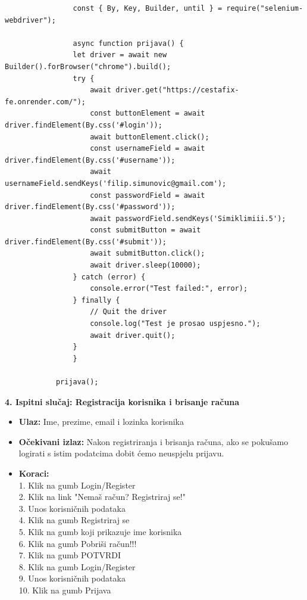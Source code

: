 			\begin{verbatim}
				const { By, Key, Builder, until } = require("selenium-webdriver");

				async function prijava() {
				let driver = await new Builder().forBrowser("chrome").build();
				try {
					await driver.get("https://cestafix-fe.onrender.com/");
					const buttonElement = await driver.findElement(By.css('#login'));
					await buttonElement.click();
					const usernameField = await driver.findElement(By.css('#username'));
					await usernameField.sendKeys('filip.simunovic@gmail.com');
					const passwordField = await driver.findElement(By.css('#password'));
					await passwordField.sendKeys('Simiklimiii.5');
					const submitButton = await driver.findElement(By.css('#submit'));
					await submitButton.click();
					await driver.sleep(10000);
				} catch (error) {
					console.error("Test failed:", error);
				} finally {
					// Quit the driver
					console.log("Test je prosao uspjesno.");
					await driver.quit();
				}
				}

			prijava();
			\end{verbatim}

			\textbf{4. Ispitni slučaj: Registracija korisnika i brisanje računa}
			 \begin{itemize}
				\item \textbf{Ulaz:} Ime, prezime, email i lozinka korisnika
				\item \textbf{Očekivani izlaz:} Nakon registriranja i brisanja računa, ako se pokušamo logirati s istim podatcima dobit ćemo neuspjelu prijavu.
				\item \textbf{Koraci:} 
				\\ 1. Klik na gumb Login/Register
				\\ 2. Klik na link "Nemaš račun? Registriraj se!"
				\\ 3. Unos korisničnih podataka
				\\ 4. Klik na gumb Registriraj se
				\\ 5. Klik na gumb koji prikazuje ime korisnika
				\\ 6. Klik na gumb Pobriši račun!!!
				\\ 7. Klik na gumb POTVRDI
				\\ 8. Klik na gumb Login/Register
				\\ 9. Unos korisničnih podataka
				\\ 10. Klik na gumb Prijava
			\end{itemize}

